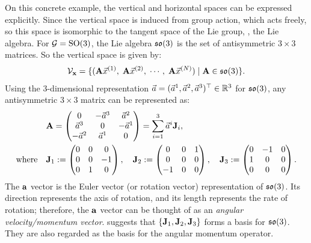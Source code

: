 On this concrete example, the vertical and horizontal spaces can be expressed explicitly. Since the vertical space is induced from group action, which acts freely, so this space is isomorphic to the tangent space of the Lie group, \ie, the Lie algebra.
For $\mathcal{G}=\mathrm{SO}(3)$, the Lie algebra $\mathfrak{so}(3)$ is the set of antisymmetric $3\times3$ matrices. So the vertical space is given by:
\begin{align}
    \mathcal{V}_{\mathbf{x}} = \{ (\mathbf{A} \vec{x}^{(1)},\; \mathbf{A} \vec{x}^{(2)},\; \cdots,\; \mathbf{A} \vec{x}^{(N)}) \mid \mathbf{A} \in \mathfrak{so}(3) \}.
\end{align}
Using the 3-dimensional representation $\vec{a} = (\vec{a}^1, \vec{a}^2, \vec{a}^3)^{\top} \in \mathbb{R}^3$ for $\mathfrak{so}(3)$, any antisymmetric $3\times3$ matrix can be represented as: %
\begin{align}
    & \mathbf{A} = \begin{pmatrix} 0 & -\vec{a}^3 & \vec{a}^2 \\ \vec{a}^3 & 0 & -\vec{a}^1 \\ -\vec{a}^2 & \vec{a}^1 & 0 \end{pmatrix}
    = \sum_{i=1}^3 \vec{a}^i \mathbf{J}_i, \label{eqn:so3-expansion} \\
    \text{where} \quad &
    \mathbf{J}_1 := \begin{pmatrix}0&0&0\\0&0&-1\\0&1&0\end{pmatrix},\quad
    \mathbf{J}_2 := \begin{pmatrix}0&0&1\\0&0&0\\-1&0&0\end{pmatrix},\quad
    \mathbf{J}_3 := \begin{pmatrix}0&-1&0\\1&0&0\\0&0&0\end{pmatrix}.
    \label{eqn:J-matrices}
\end{align}
The $\mathbf{a}$ vector is the Euler vector (or rotation vector) representation of $\mathfrak{so}(3)$. Its direction represents the axis of rotation, and its length represents the rate of rotation; therefore, the $\mathbf{a}$ vector can be thought of as an \emph{angular velocity/momentum vector}.
 suggests that $\{\mathbf{J}_1, \mathbf{J}_2, \mathbf{J}_3\}$ forms a basis for $\mathfrak{so}(3)$. They are also regarded as the basis for the angular momentum operator.
